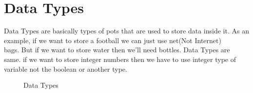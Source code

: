 \documentclass[openany]{book}  %
\begin{document}
\section{Data Types}
Data Types\cite{Ref6} are basically types of pots that are used to store data inside it. As an example, if we want to store a football we can just use net(Not Internet) \\ bags.
But if we want to store water then we'll need bottles. Data Types are \\ same. if we want to store integer numbers then we have to use integer type of \\ variable not the boolean or another type.
% 
% 
\begin{figure}[htbp]
    \begin{center}
        \caption{Data Types\cite{Ref6}}
    \end{center}
\end{figure}
% 
% 
\end{document}
